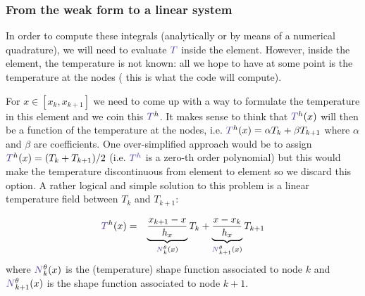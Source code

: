 \subsubsection{From the weak form to a linear system}

In order to compute these integrals (analytically or by means of a numerical quadrature), 
we will need to evaluate ${\color{Violet}T}$ inside the element. However, inside the element, 
the temperature is not known: all we hope to have at some point is the temperature at the nodes (
this is what the code will compute). 

For $x\in [x_k,x_{k+1}]$ we need to come up with a way to formulate the temperature in this element and 
we coin this ${\color{Violet}T}^h$.  
It makes sense to think that ${\color{Violet}T}^h(x)$ will then be a function of the temperature at the nodes, 
i.e. ${\color{Violet}T}^h(x) = \alpha T_k + \beta T_{k+1}$ where $\alpha$ and $\beta$ are coefficients. 
One over-simplified approach would be to assign ${\color{Violet}T}^h(x)=(T_k + T_{k+1})/2$ 
(i.e. ${\color{Violet}T^h}$ is a zero-th order polynomial) but this would make the
temperature discontinuous from element to element so we discard this option. 
A rather logical and simple solution to this problem is a linear temperature field between $T_k$
and $T_{k+1}$: 

\begin{eqnarray}
{\color{Violet}T}^h(x) 
&=& \underbrace{\frac{x_{k+1}-x}{h_x}}_{{\color{Violet}N}_k^\theta(x)} T_k 
+ 
\underbrace{\frac{x-x_k}{h_x}}_{{\color{Violet}N}_{k+1}^\theta(x)} T_{k+1} \nn
\end{eqnarray}
where ${\color{Violet}N}_k^\theta(x)$ is the (temperature) shape function associated to node $k$ and 
${\color{Violet}N}_{k+1}^\theta(x)$ is the shape function associated to node $k+1$.

